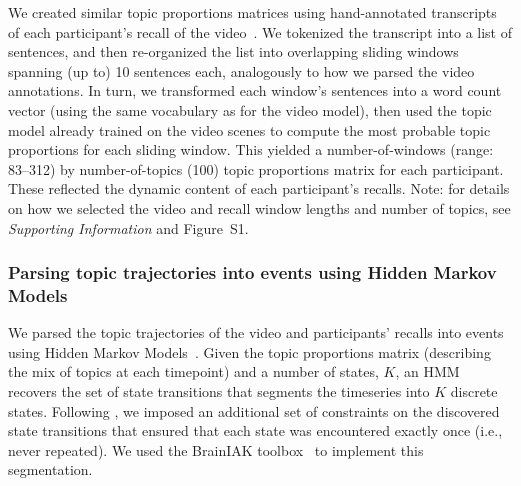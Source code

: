 \documentclass{article}
\newcommand{\topicopt}{S1}
\begin{document}
We created similar topic proportions matrices using hand-annotated transcripts of each participant's recall of the video~\citep[annotated by ][]{ChenEtal17}.  We tokenized the transcript into a list of sentences, and then re-organized the list into overlapping sliding windows spanning (up to) 10 sentences each, analogously to how we parsed the video annotations.  In turn, we transformed each window's sentences into a word count vector (using the same vocabulary as for the video model), then used the topic model already trained on the video scenes to compute the most probable topic proportions for each sliding window.  This yielded a number-of-windows (range: 83--312) by number-of-topics (100) topic proportions matrix for each participant.  These reflected the dynamic content of each participant's recalls.  Note: for details on how we selected the video and recall window lengths and number of topics, see \textit{Supporting Information} and Figure~\topicopt.


\subsubsection*{Parsing topic trajectories into events using Hidden Markov Models}
We parsed the topic trajectories of the video and participants' recalls into events using Hidden Markov Models~\citep{Rabi89}.  Given the topic proportions matrix (describing the mix of topics at each timepoint) and a number of states, $K$, an HMM recovers the set of state transitions that segments the timeseries into $K$ discrete states.  Following \cite{BaldEtal17}, we imposed an additional set of constraints on the discovered state transitions that ensured that each state was encountered exactly once (i.e., never repeated).  We used the BrainIAK toolbox~\citep{Brainiak} to implement this segmentation.
\end{document}
